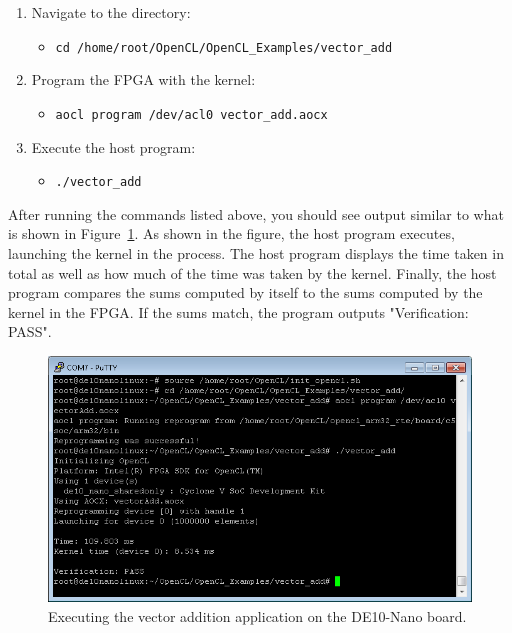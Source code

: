\documentclass[11pt, twoside, pdftex]{article}
\begin{document}
\begin{enumerate}
\item Navigate to the directory:
\begin{itemize}
\item[] \texttt{cd /home/root/OpenCL/OpenCL\_Examples/vector\_add}
\end{itemize}
\item Program the FPGA with the kernel:
\begin{itemize}
\item[] \texttt{aocl program /dev/acl0 vector\_add.aocx}
\end{itemize}
\item Execute the host program:
\begin{itemize}
\item[] \texttt{./vector\_add}
\end{itemize}
\end{enumerate}

After running the commands listed above, you should see output similar to what is shown in Figure~\ref{fig:vector_add_commandline}. As shown in the figure, the host program executes, launching the kernel in the process. The host program displays the time taken in total as well as how much of the time was taken by the kernel. Finally, the host program compares the sums computed by itself to the sums computed by the kernel in the FPGA. If the sums match, the program outputs "Verification: PASS".

\begin{figure}[H]
   \begin{center}
       \includegraphics[scale=0.7]{figures/vectoraddcommandline}
   \end{center}
   \caption{Executing the vector addition application on the DE10-Nano board.}
	\label{fig:vector_add_commandline}
\end{figure}
\end{document}
